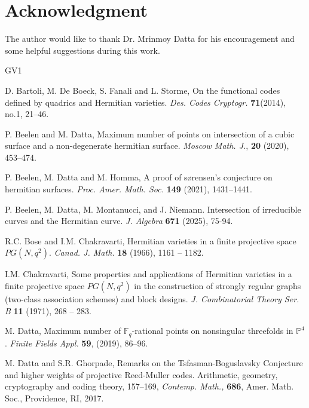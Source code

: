 \documentclass[10pt,a4paper,oneside]{amsproc}
\newcommand{\Fq}{\mathbb{F}_q}
\def\Fq{{\mathbb F}_q}
\def\PP{{\mathbb P}}
\begin{document}
\section{Acknowledgment}
The author would like to thank Dr. Mrinmoy Datta for his encouragement and some helpful suggestions during this work.

\begin{thebibliography}{GV1}

 D. Bartoli, M. De Boeck, S. Fanali and L. Storme, On the functional codes defined by quadrics and Hermitian varieties. \emph{Des. Codes Cryptogr.} {\bf71}(2014), no.1, 21–46.


P. Beelen and M. Datta,
Maximum number of points on intersection of a cubic surface and a non-degenerate hermitian surface.
\emph{Moscow Math. J.}, {\bf 20} (2020), 453--474.



P. Beelen, M. Datta and M. Homma, 
A proof of sørensen’s conjecture on hermitian surfaces.
\emph{Proc. Amer. Math. Soc.} {\bf 149} (2021), 1431--1441.

P. Beelen, M. Datta, M. Montanucci, and J. Niemann. Intersection of irreducible curves and the Hermitian
curve. \emph{J. Algebra} {\bf 671} (2025), 75-94.

R.C. Bose and I.M. Chakravarti,  Hermitian varieties in a finite projective space $PG(N,q^2)$. \emph{Canad. J. Math.} {\bf 18} (1966), 1161 -- 1182.

 I.M. Chakravarti,  Some properties and applications of Hermitian varieties in a finite projective space $PG(N,q^2)$ in the construction of strongly regular graphs (two-class association schemes) and block designs. \emph{J. Combinatorial Theory Ser. B} {\bf 11} (1971), 268 -- 283.




M. Datta, Maximum number of $\Fq$-rational points on nonsingular threefolds in $\PP^4$. \emph{Finite Fields Appl.} {\bf 59}, (2019), 86--96.


  M. Datta and S.R. Ghorpade,  Remarks on the Tsfasman-Boguslavsky Conjecture and higher weights of projective Reed-Muller codes. Arithmetic, geometry, cryptography and coding theory, 157--169, \emph{Contemp. Math.,} {\bf 686}, Amer. Math. Soc., Providence, RI, 2017. 


\end{thebibliography}
\end{document}
